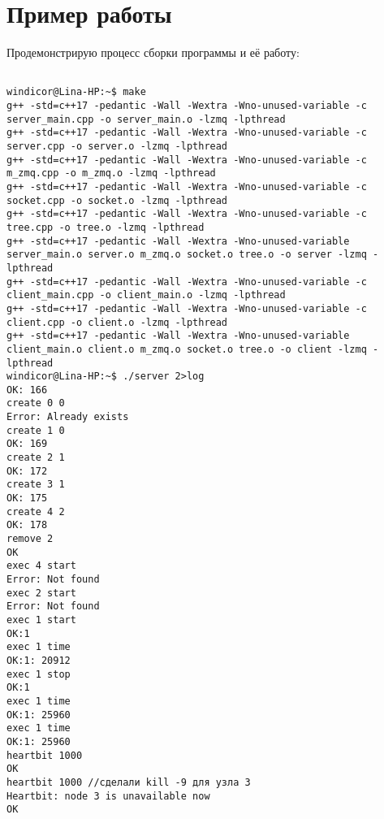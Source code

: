 \section{Пример работы}

Продемонстрирую процесс сборки программы и её работу:

\begin{verbatim}

windicor@Lina-HP:~$ make
g++ -std=c++17 -pedantic -Wall -Wextra -Wno-unused-variable -c server_main.cpp -o server_main.o -lzmq -lpthread
g++ -std=c++17 -pedantic -Wall -Wextra -Wno-unused-variable -c server.cpp -o server.o -lzmq -lpthread
g++ -std=c++17 -pedantic -Wall -Wextra -Wno-unused-variable -c m_zmq.cpp -o m_zmq.o -lzmq -lpthread
g++ -std=c++17 -pedantic -Wall -Wextra -Wno-unused-variable -c socket.cpp -o socket.o -lzmq -lpthread
g++ -std=c++17 -pedantic -Wall -Wextra -Wno-unused-variable -c tree.cpp -o tree.o -lzmq -lpthread
g++ -std=c++17 -pedantic -Wall -Wextra -Wno-unused-variable server_main.o server.o m_zmq.o socket.o tree.o -o server -lzmq -lpthread
g++ -std=c++17 -pedantic -Wall -Wextra -Wno-unused-variable -c client_main.cpp -o client_main.o -lzmq -lpthread
g++ -std=c++17 -pedantic -Wall -Wextra -Wno-unused-variable -c client.cpp -o client.o -lzmq -lpthread
g++ -std=c++17 -pedantic -Wall -Wextra -Wno-unused-variable client_main.o client.o m_zmq.o socket.o tree.o -o client -lzmq -lpthread
windicor@Lina-HP:~$ ./server 2>log
OK: 166
create 0 0
Error: Already exists
create 1 0
OK: 169
create 2 1
OK: 172
create 3 1
OK: 175
create 4 2
OK: 178
remove 2
OK
exec 4 start
Error: Not found
exec 2 start
Error: Not found
exec 1 start
OK:1
exec 1 time
OK:1: 20912
exec 1 stop
OK:1
exec 1 time
OK:1: 25960
exec 1 time
OK:1: 25960
heartbit 1000
OK
heartbit 1000 //сделали kill -9 для узла 3
Heartbit: node 3 is unavailable now
OK

\end{verbatim}

\pagebreak



